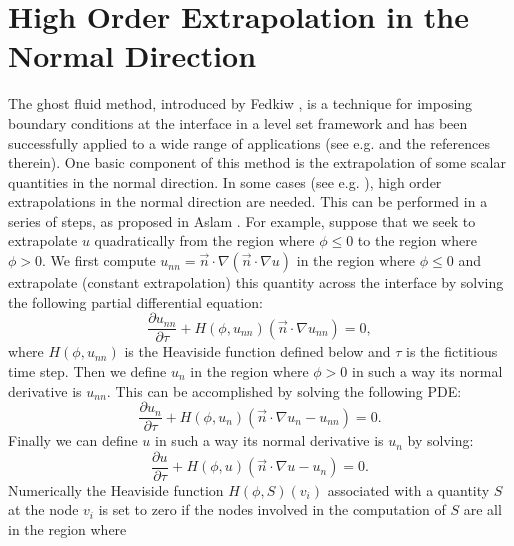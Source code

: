 \documentclass[english]{article}
\begin{document}
\section{High Order Extrapolation in the Normal Direction}
The ghost fluid method, introduced by Fedkiw \etal \cite{Fedkiw:1999:ANE}, is a technique for
imposing boundary conditions at the interface in a level set framework and has been successfully
applied to a wide range of applications (see e.g.
\cite{fedkiw:2001:VSO,fedkiw:2002:CEF,Fedkiw:Ghost_Fluid:Godunov_Methods,nguyen:2001:jcpflame,
Nguyen:2002:Conservative_Ghost_Fluid,Caiden:Incompressible_Compressible,Liu:2000:ABC,Gibou:2002:Second_Order_Accurate,Gibou:2003:Crystal_Growth_JSC,
Gibou:2003:Fourth_Order_Accurate,Gibou::Vaporization} and the references therein). One basic
component of this method is the extrapolation of some scalar quantities in the normal direction. In
some cases (see e.g. \cite{Gibou:2003:Fourth_Order_Accurate}), high order extrapolations in the
normal direction are needed. This can be performed in a series of steps, as proposed in Aslam
\cite{Aslam:Extrapolation}. For example, suppose that we seek to extrapolate $u$ quadratically from
the region where $\phi\leq 0$ to the region where $\phi>0$. We first compute
$u_{nn}=\vec{n}\cdot\nabla\left( \vec{n}\cdot\nabla u \right)$ in the region where $\phi \leq 0$
and extrapolate (constant extrapolation) this quantity across the interface by solving the
following partial differential equation:
\begin{equation*}
\frac{\partial u_{nn}}{\partial \tau} + H(\phi,u_{nn})(\vec{n}\cdot\nabla u_{nn}       )=0,
\end{equation*}
where $H(\phi,u_{nn})$ is the Heaviside function defined below and $\tau$ is the fictitious time
step. Then we define $u_n$ in the region where $\phi>0$ in such a way its normal derivative is
$u_{nn}$. This can be accomplished by solving the following PDE:
\begin{equation*}
\frac{\partial u_{n }}{\partial \tau} + H(\phi,u_n)(\vec{n}\cdot\nabla u_{n }-u_{nn})=0.
\end{equation*}
Finally we can define $u$ in such a way its normal derivative is $u_n$ by solving:
\begin{equation*}
\frac{\partial u_{  }}{\partial \tau} + H(\phi,u)(\vec{n}\cdot\nabla u     -u_{n })=0.
\end{equation*}
Numerically the Heaviside function $H(\phi,S)(v_i)$ associated with a quantity $S$ at the node
$v_i$ is set to zero if the nodes involved in the computation of $S$ are all in the region where
\end{document}
